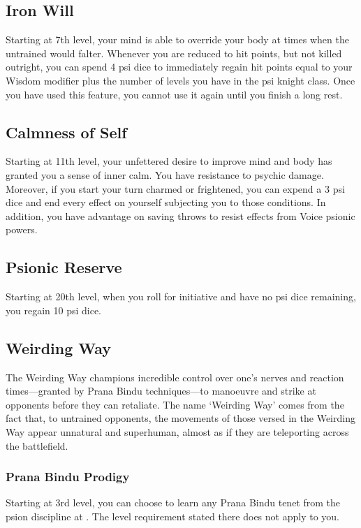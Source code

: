 \subsection{Iron Will}
Starting at 7th level,
your mind is able to override your body at times
when the untrained would falter.
Whenever you are reduced to hit points,
but not killed outright,
you can spend 4 psi dice to immediately regain hit points
equal to your Wisdom modifier plus the number of levels
you have in the psi knight class.
Once you have used this feature,
you cannot use it again until you finish a long rest.

\subsection{Calmness of Self}
Starting at 11th level,
your unfettered desire to improve mind and body
has granted you a sense of inner calm.
You have resistance to psychic damage.
Moreover, if you start your turn charmed or frightened,
you can expend a 3 psi dice and end every effect on yourself
subjecting you to those conditions.
In addition, you have advantage on saving throws to resist
effects from Voice psionic powers.

\subsection{Psionic Reserve}
Starting at 20th level,
when you roll for initiative and have no psi dice remaining,
you regain 10 psi dice.

\subsection{Weirding Way}
The Weirding Way champions incredible control over one's nerves
and reaction times---granted by Prana Bindu techniques---to
manoeuvre and strike at opponents before they can retaliate.
The name `Weirding Way' comes from the fact that,
to untrained opponents, the movements of those versed in
the Weirding Way appear unnatural and superhuman,
almost as if they are teleporting across the battlefield.

\subsubsection{Prana Bindu Prodigy}
Starting at 3rd level,
you can choose to learn any Prana Bindu tenet from
the psion discipline at .
The level requirement stated there does not apply to you.

